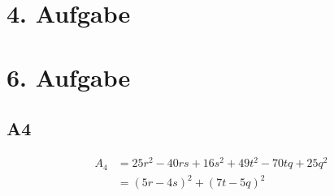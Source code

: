 \documentclass[]{article}
\begin{document}
\section*{4. Aufgabe}
\par
{}\par

\section*{6. Aufgabe}

\subsection*{A4}
\begin{align*}
	&& A_4 &= 25r^2-40rs+16s^2+49t^2-70tq+25q^2 &&\\
	&& &= (5r-4s)^2+(7t-5q)^2 &&\\
\end{align*}
\end{document}
